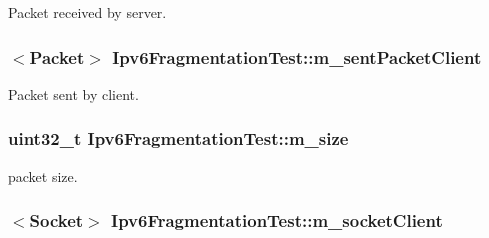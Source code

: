 Packet received by server. 

\subsubsection[{\texorpdfstring{m\+\_\+sent\+Packet\+Client}{m_sentPacketClient}}]{$<${\bf Packet}$>$ Ipv6\+Fragmentation\+Test\+::m\+\_\+sent\+Packet\+Client\hspace{0.3cm}{\ttfamily [private]}}\hypertarget{classIpv6FragmentationTest_ac14aa60abba7c0ea12a25e4ad2165133}{}\label{classIpv6FragmentationTest_ac14aa60abba7c0ea12a25e4ad2165133}


Packet sent by client. 

\subsubsection[{\texorpdfstring{m\+\_\+size}{m_size}}]{\setlength{\rightskip}{0pt plus 5cm}uint32\+\_\+t Ipv6\+Fragmentation\+Test\+::m\+\_\+size\hspace{0.3cm}{\ttfamily [private]}}\hypertarget{classIpv6FragmentationTest_aeff576474d2d8d3291e23b5410271b4f}{}\label{classIpv6FragmentationTest_aeff576474d2d8d3291e23b5410271b4f}


packet size. 

\subsubsection[{\texorpdfstring{m\+\_\+socket\+Client}{m_socketClient}}]{$<${\bf Socket}$>$ Ipv6\+Fragmentation\+Test\+::m\+\_\+socket\+Client\hspace{0.3cm}{\ttfamily [private]}}\hypertarget{classIpv6FragmentationTest_a42352629fa60d0a232d6494f6f4210f2}{}\label{classIpv6FragmentationTest_a42352629fa60d0a232d6494f6f4210f2}


